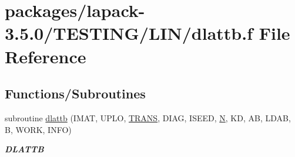\hypertarget{dlattb_8f}{}\section{packages/lapack-\/3.5.0/\+T\+E\+S\+T\+I\+N\+G/\+L\+I\+N/dlattb.f File Reference}
\label{dlattb_8f}
\subsection*{Functions/\+Subroutines}
\begin{DoxyCompactItemize}
\item 
subroutine \hyperlink{group__double__lin_gaef20b8ac00287c0f935b061ebe2c9fdf}{dlattb} (I\+M\+A\+T, U\+P\+L\+O, \hyperlink{superlu__enum__consts_8h_a0c4e17b2d5cea33f9991ccc6a6678d62a1f61e3015bfe0f0c2c3fda4c5a0cdf58}{T\+R\+A\+N\+S}, D\+I\+A\+G, I\+S\+E\+E\+D, \hyperlink{polmisc_8c_a0240ac851181b84ac374872dc5434ee4}{N}, K\+D, A\+B, L\+D\+A\+B, B, W\+O\+R\+K, I\+N\+F\+O)
\begin{DoxyCompactList}\small\item\em {\bfseries D\+L\+A\+T\+T\+B} \end{DoxyCompactList}\end{DoxyCompactItemize}
